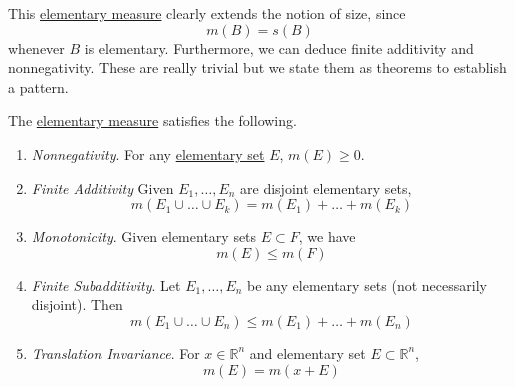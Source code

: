   This \hyperref[def:elementary-measure]{elementary measure} clearly extends the notion of size, since 
  \begin{equation}
    m(B) = s(B)
  \end{equation}
  whenever $B$ is elementary. Furthermore, we can deduce finite additivity and nonnegativity. These are really trivial but we state them as theorems to establish a pattern. 

  \begin{theorem}
    \label{thm:fundamental-properties-of-elementary-measure}
    The \hyperref[def:elementary-measure]{elementary measure} satisfies the following. 
    \begin{enumerate}
      \item \textit{Nonnegativity}. For any \hyperref[def:elementary-set]{elementary set} $E$, $m(E) \geq 0$. 
      \item \textit{Finite Additivity} Given $E_1, \ldots, E_n$ are disjoint elementary sets, 
      \begin{equation}
        m(E_1 \cup \ldots \cup E_k) = m(E_1) + \ldots + m(E_k)
      \end{equation}

      \item \textit{Monotonicity}. Given elementary sets $E \subset F$, we have 
      \begin{equation}
        m(E) \leq m(F)
      \end{equation}

      \item \textit{Finite Subadditivity}. Let $E_1, \ldots, E_n$ be any elementary sets (not necessarily disjoint). Then 
      \begin{equation}
        m(E_1 \cup \ldots \cup E_n) \leq m(E_1) + \ldots + m(E_n)
      \end{equation}

      \item \textit{Translation Invariance}. For $x \in \mathbb{R}^n$ and elementary set $E \subset \mathbb{R}^n$, 
      \begin{equation}
        m(E) = m(x + E) 
      \end{equation}
    \end{enumerate}
  \end{theorem}
